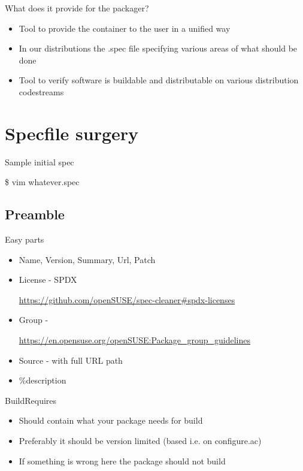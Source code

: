 \documentclass{beamer}
\begin{document}
\begin{frame}[t]{What does it provide for the packager?}
	\begin{itemize}
	\item Tool to provide the container to the user in a unified way
	\item In our distributions the .spec file specifying various areas of what should be done
	\item Tool to verify software is buildable and distributable on various distribution codestreams
	\end{itemize}
\end{frame}

\section{Specfile surgery}

\begin{frame}[t]{Sample initial spec}
	\begin{center}\$ vim whatever.spec\end{center}
\end{frame}

\subsection{Preamble}

\begin{frame}[t]{Easy parts}
	\begin{itemize}
	\item Name, Version, Summary, Url, Patch
	\item License - SPDX \begin{small}\url{https://github.com/openSUSE/spec-cleaner\#spdx-licenses}\end{small}
    \item Group - \begin{small}\url{https://en.opensuse.org/openSUSE:Package\_group\_guidelines}\end{small}
    \item Source - with full URL path
    \item \%description
	\end{itemize}
\end{frame}

\begin{frame}[t]{BuildRequires}
	\begin{itemize}
	\item Should contain what your package needs for build
    \item Preferably it should be version limited (based i.e. on configure.ac)
    \item If something is wrong here the package should not build
	\end{itemize}
\end{frame}
\end{document}
